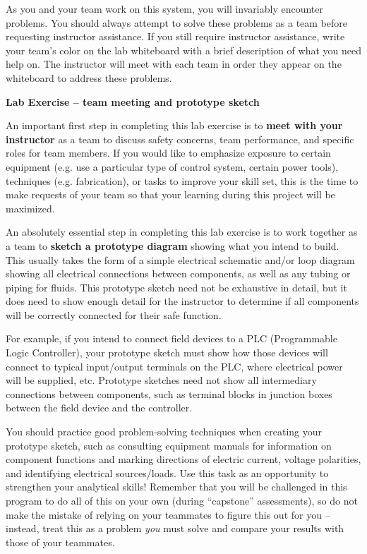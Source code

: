 As you and your team work on this system, you will invariably encounter problems.  You should always attempt to solve these problems as a team before requesting instructor assistance.  If you still require instructor assistance, write your team's color on the lab whiteboard with a brief description of what you need help on.  The instructor will meet with each team in order they appear on the whiteboard to address these problems.





\vfil \eject

\noindent
{\bf Lab Exercise -- team meeting and prototype sketch}

\vskip 5pt

An important first step in completing this lab exercise is to {\bf meet with your instructor} as a team to discuss safety concerns, team performance, and specific roles for team members.  If you would like to emphasize exposure to certain equipment (e.g. use a particular type of control system, certain power tools), techniques (e.g. fabrication), or tasks to improve your skill set, this is the time to make requests of your team so that your learning during this project will be maximized.

\vskip 10pt

An absolutely essential step in completing this lab exercise is to work together as a team to {\bf sketch a prototype diagram} showing what you intend to build.  This usually takes the form of a simple electrical schematic and/or loop diagram showing all electrical connections between components, as well as any tubing or piping for fluids.  This prototype sketch need not be exhaustive in detail, but it does need to show enough detail for the instructor to determine if all components will be correctly connected for their safe function.

For example, if you intend to connect field devices to a PLC (Programmable Logic Controller), your prototype sketch must show how those devices will connect to typical input/output terminals on the PLC, where electrical power will be supplied, etc.  Prototype sketches need not show all intermediary connections between components, such as terminal blocks in junction boxes between the field device and the controller.

You should practice good problem-solving techniques when creating your prototype sketch, such as consulting equipment manuals for information on component functions and marking directions of electric current, voltage polarities, and identifying electrical sources/loads.  Use this task as an opportunity to strengthen your analytical skills!  Remember that you will be challenged in this program to do all of this on your own (during ``capstone'' assessments), so do not make the mistake of relying on your teammates to figure this out for you -- instead, treat this as a problem {\it you} must solve and compare your results with those of your teammates.

